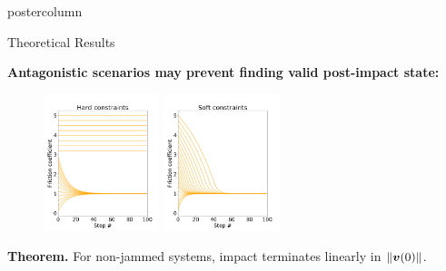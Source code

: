 \documentclass[final,hyperref={pdfpagelabels=false},5pt]{beamer}
\begin{document}
\begin{frame}
\begin{columns}
\begin{column}{.49\textwidth}
\begin{beamercolorbox}[center,wd=\textwidth]{postercolumn}
\begin{minipage}[T]{.95\textwidth}
{\begin{block}{Theoretical Results}
\begin{center}
               \textbf{\color{pennrd} Antagonistic scenarios may prevent finding valid post-impact state:}
               \end{center}
              \begin{figure}
              	\includegraphics[width=0.3\textwidth]{hard_constraints}
              	\hspace{0.125\textwidth}
              	\includegraphics[width=0.3\textwidth]{soft_constraints}
              \end{figure}
              \begin{tcolorbox}[colback=pennyw,
colframe=penndyw,boxrule=5pt,coltext=pennbl,outer arc=5pt,arc=0pt]
              \textbf{Theorem.} For non-jammed systems, impact terminates linearly in $\left\lVert\bm{v}(0)\right\rVert$.	
              \end{tcolorbox}     
            \end{block}
            
}
\end{minipage}
\end{beamercolorbox}
\end{column}
\end{columns}
\end{frame}
\end{document}
